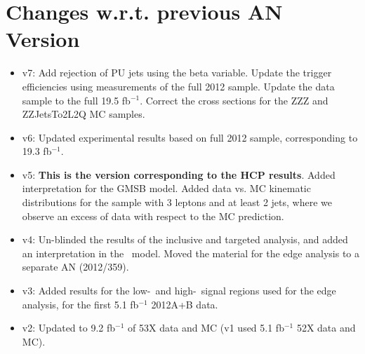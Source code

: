 \section{Changes w.r.t. previous AN Version}
\label{sec:changes}

\begin{itemize}

\item v7: Add rejection of PU jets using the beta variable. Update the trigger efficiencies using measurements of the full 2012 sample. Update the data sample to the full 19.5 fb$^{-1}$. Correct the cross sections for the ZZZ and ZZJetsTo2L2Q MC samples.
\item v6: Updated experimental results based on full 2012 sample, corresponding to 19.3 fb$^{-1}$.
\item v5: {\bf This is the version corresponding to the HCP results}. Added interpretation for the GMSB model. %
Added data vs. MC kinematic distributions for the sample with 3 leptons and at least 2 jets, where we observe an excess of data with respect to the MC prediction. %
\item v4: Un-blinded the results of the inclusive and targeted analysis, and added an interpretation in the \wzmet\ model. Moved the material for the edge analysis to a separate AN (2012/359).
\item v3: Added results for the low-\MET\ and high-\MET\ signal regions used for the edge analysis, for the first 5.1 fb$^{-1}$ 2012A+B data.
\item v2: Updated to 9.2 fb$^{-1}$ of 53X data and MC (v1 used 5.1 fb$^{-1}$ 52X data and MC).

\end{itemize}
